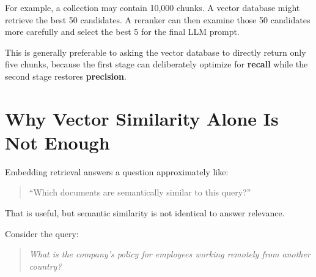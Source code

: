 \documentclass[12pt, a4paper]{article}
\begin{document}

For example, a collection may contain 10,000 chunks. A vector database might retrieve the best 50 candidates. A reranker can then examine those 50 candidates more carefully and select the best 5 for the final LLM prompt.

This is generally preferable to asking the vector database to directly return only five chunks, because the first stage can deliberately optimize for \textbf{recall} while the second stage restores \textbf{precision}.

\section{Why Vector Similarity Alone Is Not Enough}

Embedding retrieval answers a question approximately like:

\begin{quote}
``Which documents are semantically similar to this query?''
\end{quote}

That is useful, but semantic similarity is not identical to answer relevance.

Consider the query:

\begin{quote}
\textit{What is the company's policy for employees working remotely from another country?}
\end{quote}
\end{document}
